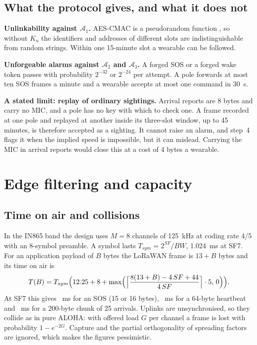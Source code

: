 \documentclass[11pt,a4paper]{article}
\begin{document}
\subsection{What the protocol gives, and what it does not}
\textbf{Unlinkability against $\mathcal A_1$.} AES-CMAC is a pseudorandom function \cite{rfc4493}, so without $K_u$ the
identifiers and addresses of different slots are indistinguishable from random strings. Within one 15-minute slot a
wearable can be followed.

\textbf{Unforgeable alarms against $\mathcal A_2$ and $\mathcal A_3$.} A forged SOS or a forged wake token passes with
probability $2^{-32}$ or $2^{-24}$ per attempt. A pole forwards at most ten SOS frames a minute and a wearable accepts
at most one command in 30~s.

\textbf{A stated limit: replay of ordinary sightings.} Arrival reports are 8 bytes and carry no MIC, and a pole has no
key with which to check one. A frame recorded at one pole and replayed at another inside its three-slot window, up to
45 minutes, is therefore accepted as a sighting. It cannot raise an alarm, and step~4 flags it when the implied speed
is impossible, but it can mislead. Carrying the MIC in arrival reports would close this at a cost of 4 bytes a wearable.

\section{Edge filtering and capacity}
\subsection{Time on air and collisions}
In the IN865 band \cite{rp002,wpc} the design uses $M=8$ channels of 125~kHz at coding rate 4/5 with an 8-symbol
preamble. A symbol lasts $T_{sym}=2^{SF}/BW$, 1.024~ms at SF7. For an application payload of $B$ bytes the LoRaWAN
frame is $13+B$ bytes and its time on air is \cite{semtech}
\begin{equation}T(B)=T_{sym}\Bigl(12.25+8+\max\Bigl(\Bigl\lceil\frac{8(13+B)-4\,SF+44}{4\,SF}\Bigr\rceil\cdot 5,\,0\Bigr)\Bigr).\end{equation}
At SF7 this gives \ToaSos~ms for an SOS (15 or 16 bytes), \ToaBloom~ms for a 64-byte heartbeat and \ToaChunk~ms for a
200-byte chunk of 25 arrivals. Uplinks are unsynchronised, so they collide as in pure ALOHA: with offered load $G$ per
channel a frame is lost with probability $1-e^{-2G}$. Capture and the partial orthogonality of spreading factors are
ignored, which makes the figures pessimistic.
\end{document}
